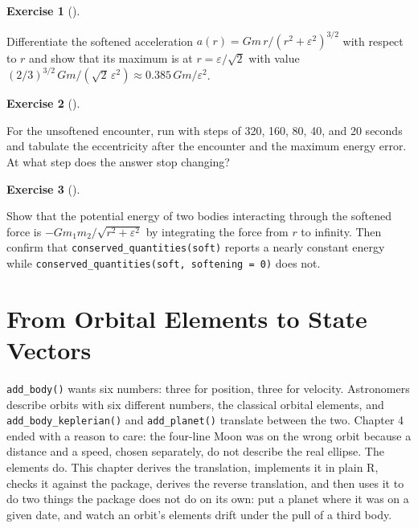 \documentclass[
  10.5pt,
  letterpaper,
]{scrbook}
\theoremstyle{definition}
\newtheorem{exercise}{Exercise}[chapter]
\theoremstyle{plain}
\theoremstyle{remark}
\begin{document}
\begin{exercise}[]\protect\hypertarget{exr-ch6-max-force}{}\label{exr-ch6-max-force}

Differentiate the softened acceleration
\(a(r) = Gm\,r/(r^2+\varepsilon^2)^{3/2}\) with respect to \(r\) and
show that its maximum is at \(r = \varepsilon/\sqrt2\) with value
\((2/3)^{3/2}\,Gm/(\sqrt{2}\,\varepsilon^2) \approx 0.385\,Gm/\varepsilon^2\).

\end{exercise}

\begin{exercise}[]\protect\hypertarget{exr-ch6-step}{}\label{exr-ch6-step}

For the unsoftened encounter, run with steps of 320, 160, 80, 40, and 20
seconds and tabulate the eccentricity after the encounter and the
maximum energy error. At what step does the answer stop changing?

\end{exercise}

\begin{exercise}[]\protect\hypertarget{exr-ch6-potential}{}\label{exr-ch6-potential}

Show that the potential energy of two bodies interacting through the
softened force is \(-Gm_1m_2/\sqrt{r^2+\varepsilon^2}\) by integrating
the force from \(r\) to infinity. Then confirm that
\texttt{conserved\_quantities(soft)} reports a nearly constant energy
while \texttt{conserved\_quantities(soft,\ softening\ =\ 0)} does not.

\end{exercise}

\chapter{From Orbital Elements to State Vectors}\label{sec-keplerian}

\texttt{add\_body()} wants six numbers: three for position, three for
velocity. Astronomers describe orbits with six different numbers, the
classical orbital elements, and \texttt{add\_body\_keplerian()} and
\texttt{add\_planet()} translate between the two. Chapter 4 ended with a
reason to care: the four-line Moon was on the wrong orbit because a
distance and a speed, chosen separately, do not describe the real
ellipse. The elements do. This chapter derives the translation,
implements it in plain R, checks it against the package, derives the
reverse translation, and then uses it to do two things the package does
not do on its own: put a planet where it was on a given date, and watch
an orbit's elements drift under the pull of a third body.
\end{document}
